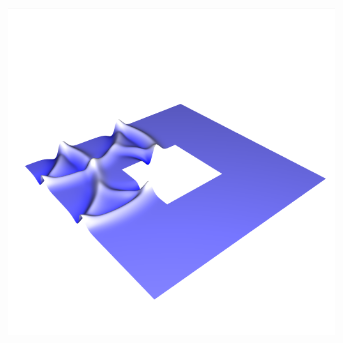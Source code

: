 \documentclass[crop=false,10pt,ngerman]{standalone}
\begin{document}
\begin{figure}[h]
\begin{subfigure}[b]{0.24\textwidth}
          \caption{}
        \end{subfigure}
        \begin{subfigure}[b]{0.24\textwidth}
          \center
          \includegraphics[trim={0.9cm 1.8cm 0.5cm 5cm},clip,width=0.95\textwidth]{images/ring_wave_3.png}
          \caption{}
        \end{subfigure}


\end{figure}
\end{document}

